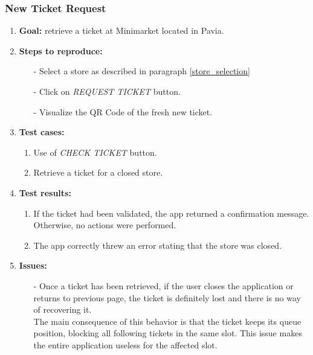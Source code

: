 \documentclass[table, 12pt]{article}
\begin{document}
\subsubsection{New Ticket Request}
\begin{enumerate}[i]
    \item \textbf{Goal:} retrieve a ticket at Minimarket located in Pavia.
    \item \textbf{Steps to reproduce:}
          \begin{itemize}
              \item[-] Select a store as described in paragraph \ref{store_selection}
              \item[-] Click on \textit{REQUEST TICKET} button.
              \item[-] Visualize the QR Code of the fresh new ticket.
          \end{itemize}
    \item \textbf{Test cases:}
          \begin{enumerate}
              \item Use of \textit{CHECK TICKET} button.
              \item Retrieve a ticket for a closed store.
          \end{enumerate}
    \item \textbf{Test results:}
          \begin{enumerate}
              \item If the ticket had been validated, the app returned a confirmation message. Otherwise, no actions were performed.
              \item The app correctly threw an error stating that the store was closed.
          \end{enumerate}
    \item \textbf{Issues:}
          \begin{itemize}
              \item[-] Once a ticket has been retrieved, if the user closes the application or returns to previous page, the ticket is definitely lost and there is no way of recovering it.\\The main consequence of this behavior is that the ticket keeps its queue position, blocking all following tickets in the same slot. This issue makes the entire application useless for the affected slot.
          \end{itemize}
\end{enumerate}
\end{document}
